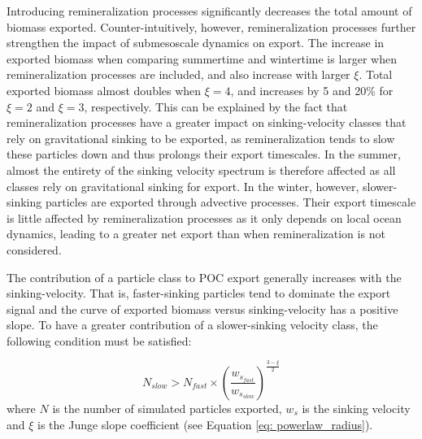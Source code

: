 \documentclass[draft,linenumbers]{agujournal2018}
\begin{document}
Introducing remineralization processes significantly decreases the total amount of biomass exported. Counter-intuitively, however, remineralization processes further strengthen the impact of submesoscale dynamics on export. The increase in exported biomass when comparing summertime and wintertime is larger when remineralization processes are included, and also increase with larger $\xi$. Total exported biomass almost doubles when $\xi =4$, and increases by 5 and 20\% for $\xi =2$ and $\xi = 3$, respectively. This can be explained by the fact that remineralization processes have a greater impact on sinking-velocity classes that rely on gravitational sinking to be exported, as remineralization tends to slow these particles down and thus prolongs their export timescales. In the summer, almost the entirety of the sinking velocity spectrum is therefore affected as all classes rely on gravitational sinking for export. In the winter, however, slower-sinking particles are exported through advective processes. Their export timescale is little affected by remineralization processes as it only depends on local ocean dynamics, leading to a greater net export than when remineralization is not considered.

The contribution of a particle class to POC export generally increases with the sinking-velocity. That is, faster-sinking particles tend to dominate the export signal and the curve of exported biomass versus sinking-velocity has a positive slope. To have a greater contribution of a slower-sinking velocity class, the following condition must be satisfied:

\begin{equation}
    N_{slow} > N_{fast} \times \left(\frac{w_{s_{fast}}}{w_{s_{slow}}}\right)^{\frac{3 - \xi}{2}}
    \label{eq: condition}
\end{equation}
where $N$ is the number of simulated particles exported, $w_s$ is the sinking velocity and $\xi$ is the Junge slope coefficient (see Equation \ref{eq: powerlaw_radius}).
\end{document}
